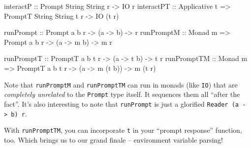 \documentclass[]{article}
\newenvironment{Shaded}{}{}
\newcommand{\DataTypeTok}[1]{\textcolor[rgb]{0.56,0.13,0.00}{#1}}
\newcommand{\NormalTok}[1]{#1}
\newcommand{\OtherTok}[1]{\textcolor[rgb]{0.00,0.44,0.13}{#1}}
\begin{document}
\begin{Shaded}
\begin{Highlighting}[]
\OtherTok{interactP   ::}                  \DataTypeTok{Prompt}  \DataTypeTok{String} \DataTypeTok{String}\NormalTok{   r }\OtherTok{{-}\textgreater{}} \DataTypeTok{IO}\NormalTok{ r}
\OtherTok{interactPT  ::} \DataTypeTok{Applicative}\NormalTok{ t }\OtherTok{=\textgreater{}} \DataTypeTok{PromptT} \DataTypeTok{String} \DataTypeTok{String}\NormalTok{ t r }\OtherTok{{-}\textgreater{}} \DataTypeTok{IO}\NormalTok{ (t r)}

\OtherTok{runPrompt   ::}                  \DataTypeTok{Prompt}\NormalTok{  a b   r }\OtherTok{{-}\textgreater{}}\NormalTok{ (a }\OtherTok{{-}\textgreater{}}\NormalTok{   b) }\OtherTok{{-}\textgreater{}}\NormalTok{ r}
\OtherTok{runPromptM  ::} \DataTypeTok{Monad}\NormalTok{ m       }\OtherTok{=\textgreater{}} \DataTypeTok{Prompt}\NormalTok{  a b   r }\OtherTok{{-}\textgreater{}}\NormalTok{ (a }\OtherTok{{-}\textgreater{}}\NormalTok{ m b) }\OtherTok{{-}\textgreater{}}\NormalTok{ m r}

\OtherTok{runPromptT  ::}                  \DataTypeTok{PromptT}\NormalTok{ a b t r }\OtherTok{{-}\textgreater{}}\NormalTok{ (a }\OtherTok{{-}\textgreater{}}\NormalTok{    t b)  }\OtherTok{{-}\textgreater{}}\NormalTok{ t r}
\OtherTok{runPromptTM ::} \DataTypeTok{Monad}\NormalTok{ m       }\OtherTok{=\textgreater{}} \DataTypeTok{PromptT}\NormalTok{ a b t r }\OtherTok{{-}\textgreater{}}\NormalTok{ (a }\OtherTok{{-}\textgreater{}}\NormalTok{ m (t b)) }\OtherTok{{-}\textgreater{}}\NormalTok{ m (t r)}
\end{Highlighting}
\end{Shaded}

Note that \texttt{runPromptM} and \texttt{runPromptTM} can run in monads (like
\texttt{IO}) that are \emph{completely unrelated} to the \texttt{Prompt} type
itself. It sequences them all ``after the fact''. It's also interesting to note
that \texttt{runPrompt} is just a glorified
\texttt{Reader\ (a\ -\textgreater{}\ b)\ r}.

With \texttt{runPromptTM}, you can incorporate \texttt{t} in your ``prompt
response'' function, too. Which brings us to our grand finale -- environment
variable parsing!
\end{document}
